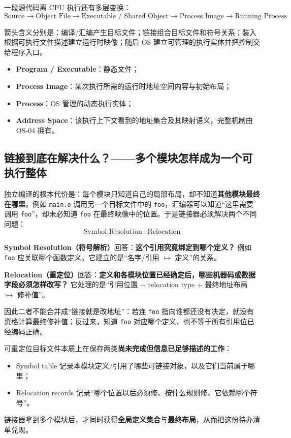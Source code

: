 \documentclass[11pt,a4paper]{ctexart}
\newcommand{\kw}[1]{\textbf{#1}}
\newcommand{\code}[1]{\texttt{#1}}
\begin{document}
一段源代码离 CPU 执行还有多层变换：
\[
\boxed{
\text{Source}
\rightarrow
\text{Object File}
\rightarrow
\text{Executable / Shared Object}
\rightarrow
\text{Process Image}
\rightarrow
\text{Running Process}
}
\]

箭头含义分别是：编译/汇编产生目标文件；链接组合目标文件和符号关系；装入根据可执行文件描述建立运行时映像；随后 OS 建立可管理的执行实体并把控制交给程序入口。

\begin{warn}[四个对象不能混]
\begin{itemize}
  \item \kw{Program / Executable}：静态文件；
  \item \kw{Process Image}：某次执行所需的运行时地址空间内容与初始布局；
  \item \kw{Process}：OS 管理的动态执行实体；
  \item \kw{Address Space}：该执行上下文看到的地址集合及其映射语义，完整机制由 OS-04 拥有。
\end{itemize}
\end{warn}

\subsection{链接到底在解决什么？——多个模块怎样成为一个可执行整体}

独立编译的根本代价是：每个模块只知道自己的局部布局，却不知道\kw{其他模块最终在哪里}。例如 \code{main.o} 调用另一个目标文件中的 \code{foo}，汇编器可以知道“这里需要调用 \code{foo}”，却未必知道 \code{foo} 在最终映像中的位置。于是链接器必须解决两个不同问题：
\[
\boxed{\text{Symbol Resolution} + \text{Relocation}}
\]

\kw{Symbol Resolution（符号解析）}回答：\textbf{这个引用究竟绑定到哪个定义？} 例如 \code{foo} 应关联哪个函数定义。它建立的是“名字/引用 $\mapsto$ 定义”的关系。

\kw{Relocation（重定位）}回答：\textbf{定义和各模块位置已经确定后，哪些机器码或数据字段必须怎样改写？} 它处理的是“引用位置 + relocation type + 最终地址布局 $\mapsto$ 修补值”。

因此二者不能合并成“链接就是改地址”：若连 \code{foo} 指向谁都还没有决定，就没有资格计算最终修补值；反过来，知道 \code{foo} 对应哪个定义，也不等于所有引用位已经编码正确。

\begin{method}
可重定位目标文件本质上在保存两类\kw{尚未完成但信息已足够描述的工作}：
\begin{itemize}
  \item Symbol table 记录本模块定义/引用了哪些可链接对象，以及它们当前属于哪里；
  \item Relocation records 记录“哪个位置以后必须修、按什么规则修、它依赖哪个符号”。
\end{itemize}
链接器拿到多个模块后，才同时获得\kw{全局定义集合}与\kw{最终布局}，从而把这份待办清单兑现。
\end{method}
\end{document}
